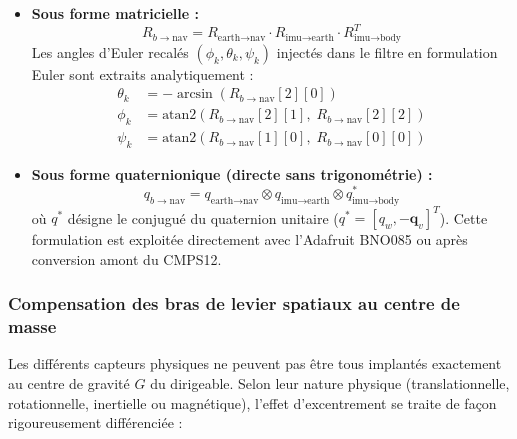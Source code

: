 \documentclass[../Formulations_Kalman.tex]{subfiles}
\begin{document}
\begin{itemize}
    \item \textbf{Sous forme matricielle :}
    \begin{equation}
    R_{b \to \text{nav}} = R_{\text{earth} \to \text{nav}} \cdot R_{\text{imu} \to \text{earth}} \cdot R_{\text{imu} \to \text{body}}^T
    \end{equation}
    Les angles d'Euler recalés $(\phi_k, \theta_k, \psi_k)$ injectés dans le filtre en formulation Euler sont extraits analytiquement :
    \begin{align}
    \theta_k &= -\arcsin\left(R_{b \to \text{nav}}[2][0]\right) \\
    \phi_k &= \text{atan2}\left(R_{b \to \text{nav}}[2][1], \; R_{b \to \text{nav}}[2][2]\right) \\
    \psi_k &= \text{atan2}\left(R_{b \to \text{nav}}[1][0], \; R_{b \to \text{nav}}[0][0]\right)
    \end{align}
    \item \textbf{Sous forme quaternionique (directe sans trigonométrie) :}
    \begin{equation}
    q_{b \to \text{nav}} = q_{\text{earth} \to \text{nav}} \otimes q_{\text{imu} \to \text{earth}} \otimes q_{\text{imu} \to \text{body}}^*
    \end{equation}
    où $q^*$ désigne le conjugué du quaternion unitaire ($q^* = [q_w, -\mathbf{q}_v]^T$). Cette formulation est exploitée directement avec l'Adafruit BNO085 ou après conversion amont du CMPS12.
\end{itemize}

\subsubsection{Compensation des bras de levier spatiaux au centre de masse}
Les différents capteurs physiques ne peuvent pas être tous implantés exactement au centre de gravité $G$ du dirigeable. Selon leur nature physique (translationnelle, rotationnelle, inertielle ou magnétique), l'effet d'excentrement se traite de façon rigoureusement différenciée :
\end{document}
